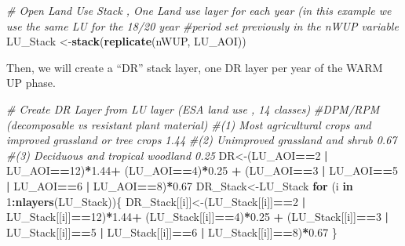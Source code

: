 \documentclass[
  10pt,
  b5paper,
]{book}
\newenvironment{Shaded}{\begin{snugshade}}{\end{snugshade}}
\newcommand{\CommentTok}[1]{\textcolor[rgb]{0.56,0.35,0.01}{\textit{#1}}}
\newcommand{\ControlFlowTok}[1]{\textcolor[rgb]{0.13,0.29,0.53}{\textbf{#1}}}
\newcommand{\DecValTok}[1]{\textcolor[rgb]{0.00,0.00,0.81}{#1}}
\newcommand{\FloatTok}[1]{\textcolor[rgb]{0.00,0.00,0.81}{#1}}
\newcommand{\KeywordTok}[1]{\textcolor[rgb]{0.13,0.29,0.53}{\textbf{#1}}}
\newcommand{\NormalTok}[1]{#1}
\newcommand{\OperatorTok}[1]{\textcolor[rgb]{0.81,0.36,0.00}{\textbf{#1}}}
\newcommand{\StringTok}[1]{\textcolor[rgb]{0.31,0.60,0.02}{#1}}
\begin{document}
\begin{Shaded}
\begin{Highlighting}[]
\CommentTok{# Open Land Use Stack , One Land use layer for each year (in this example we use the same LU for the 18/20 year #period set previously in the nWUP variable}
\NormalTok{ LU_Stack <-}\KeywordTok{stack}\NormalTok{(}\KeywordTok{replicate}\NormalTok{(nWUP, LU_AOI))}
\end{Highlighting}
\end{Shaded}

Then, we will create a ``DR'' stack layer, one DR layer per year of the WARM UP phase.

\begin{Shaded}
\begin{Highlighting}[]
\CommentTok{# Create DR Layer from LU layer (ESA land use , 14 classes)}
\CommentTok{#DPM/RPM (decomposable vs resistant plant material)}
\CommentTok{#(1) Most agricultural crops and improved grassland or tree crops 1.44 }
\CommentTok{#(2) Unimproved grassland and shrub 0.67}
\CommentTok{#(3) Deciduous and tropical woodland 0.25    }
\NormalTok{DR<-(LU_AOI}\OperatorTok{==}\DecValTok{2} \OperatorTok{|}\StringTok{ }\NormalTok{LU_AOI}\OperatorTok{==}\DecValTok{12}\NormalTok{)}\OperatorTok{*}\FloatTok{1.44}\OperatorTok{+}\StringTok{ }\NormalTok{(LU_AOI}\OperatorTok{==}\DecValTok{4}\NormalTok{)}\OperatorTok{*}\FloatTok{0.25} \OperatorTok{+}\StringTok{ }\NormalTok{(LU_AOI}\OperatorTok{==}\DecValTok{3} \OperatorTok{|}\StringTok{ }\NormalTok{LU_AOI}\OperatorTok{==}\DecValTok{5} \OperatorTok{|}\StringTok{ }\NormalTok{LU_AOI}\OperatorTok{==}\DecValTok{6} \OperatorTok{|}\StringTok{ }\NormalTok{LU_AOI}\OperatorTok{==}\DecValTok{8}\NormalTok{)}\OperatorTok{*}\FloatTok{0.67}
\NormalTok{DR_Stack<-LU_Stack}
\ControlFlowTok{for}\NormalTok{ (i }\ControlFlowTok{in} \DecValTok{1}\OperatorTok{:}\KeywordTok{nlayers}\NormalTok{(LU_Stack))\{}
\NormalTok{DR_Stack[[i]]<-(LU_Stack[[i]]}\OperatorTok{==}\DecValTok{2} \OperatorTok{|}\StringTok{ }\NormalTok{LU_Stack[[i]]}\OperatorTok{==}\DecValTok{12}\NormalTok{)}\OperatorTok{*}\FloatTok{1.44}\OperatorTok{+}\StringTok{ }\NormalTok{(LU_Stack[[i]]}\OperatorTok{==}\DecValTok{4}\NormalTok{)}\OperatorTok{*}\FloatTok{0.25} \OperatorTok{+}\StringTok{ }\NormalTok{(LU_Stack[[i]]}\OperatorTok{==}\DecValTok{3} \OperatorTok{|}\StringTok{ }\NormalTok{LU_Stack[[i]]}\OperatorTok{==}\DecValTok{5} \OperatorTok{|}\StringTok{ }\NormalTok{LU_Stack[[i]]}\OperatorTok{==}\DecValTok{6} \OperatorTok{|}\StringTok{ }\NormalTok{LU_Stack[[i]]}\OperatorTok{==}\DecValTok{8}\NormalTok{)}\OperatorTok{*}\FloatTok{0.67}
\NormalTok{\}}
\end{Highlighting}
\end{Shaded}
\end{document}
